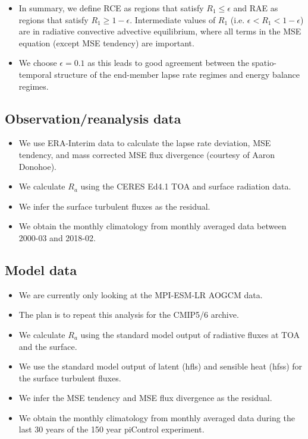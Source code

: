 \documentclass{ametsocV5}
\begin{document}
\begin{itemize}
  \item In summary, we define RCE as regions that satisfy \(R_{1}\le\epsilon\) and RAE as regions that satisfy \(R_{1}\ge 1-\epsilon\). Intermediate values of \(R_{1}\) (i.e. \(\epsilon < R_{1} < 1-\epsilon\)) are in radiative convective advective equilibrium, where all terms in the MSE equation (except MSE tendency) are important.
  \item We choose \(\epsilon=0.1\) as this leads to good agreement between the spatio-temporal structure of the end-member lapse rate regimes and energy balance regimes.
\end{itemize}

\subsection{Observation/reanalysis data}
\begin{itemize}
  \item We use ERA-Interim data to calculate the lapse rate deviation, MSE tendency, and mass corrected MSE flux divergence (courtesy of Aaron Donohoe).
  \item We calculate \(R_{a}\) using the CERES Ed4.1 TOA and surface radiation data.
  \item We infer the surface turbulent fluxes as the residual.
  \item We obtain the monthly climatology from monthly averaged data between 2000-03 and 2018-02.
\end{itemize}

\subsection{Model data}
\begin{itemize}
  \item We are currently only looking at the MPI-ESM-LR AOGCM data.
  \item The plan is to repeat this analysis for the CMIP5/6 archive.
  \item We calculate \(R_{a}\) using the standard model output of radiative fluxes at TOA and the surface.
  \item We use the standard model output of latent (hfls) and sensible heat (hfss) for the surface turbulent fluxes.
  \item We infer the MSE tendency and MSE flux divergence as the residual.
  \item We obtain the monthly climatology from monthly averaged data during the last 30 years of the 150 year piControl experiment.
\end{itemize}
\end{document}

